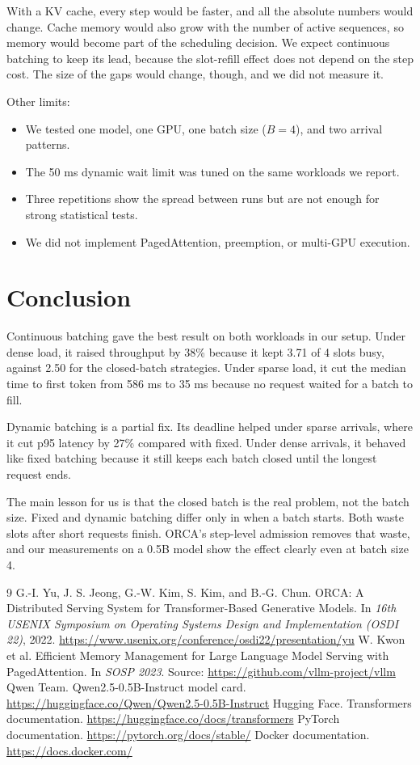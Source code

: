 \documentclass[12pt,a4paper]{article}
\begin{document}
With a KV cache, every step would be faster, and all the absolute numbers would change. Cache memory would also grow with the number of active sequences, so memory would become part of the scheduling decision. We expect continuous batching to keep its lead, because the slot-refill effect does not depend on the step cost. The size of the gaps would change, though, and we did not measure it.

Other limits:
\begin{itemize}
    \item We tested one model, one GPU, one batch size ($B = 4$), and two arrival patterns.
    \item The 50 ms dynamic wait limit was tuned on the same workloads we report.
    \item Three repetitions show the spread between runs but are not enough for strong statistical tests.
    \item We did not implement PagedAttention, preemption, or multi-GPU execution.
\end{itemize}

\section{Conclusion}
Continuous batching gave the best result on both workloads in our setup. Under dense load, it raised throughput by 38\% because it kept 3.71 of 4 slots busy, against 2.50 for the closed-batch strategies. Under sparse load, it cut the median time to first token from 586 ms to 35 ms because no request waited for a batch to fill.

Dynamic batching is a partial fix. Its deadline helped under sparse arrivals, where it cut p95 latency by 27\% compared with fixed. Under dense arrivals, it behaved like fixed batching because it still keeps each batch closed until the longest request ends.

The main lesson for us is that the closed batch is the real problem, not the batch size. Fixed and dynamic batching differ only in when a batch starts. Both waste slots after short requests finish. ORCA's step-level admission removes that waste, and our measurements on a 0.5B model show the effect clearly even at batch size 4.

\begin{thebibliography}{9}
 G.-I. Yu, J. S. Jeong, G.-W. Kim, S. Kim, and B.-G. Chun. ORCA: A Distributed Serving System for Transformer-Based Generative Models. In \emph{16th USENIX Symposium on Operating Systems Design and Implementation (OSDI 22)}, 2022. \url{https://www.usenix.org/conference/osdi22/presentation/yu}
 W. Kwon et al. Efficient Memory Management for Large Language Model Serving with PagedAttention. In \emph{SOSP 2023}. Source: \url{https://github.com/vllm-project/vllm}
 Qwen Team. Qwen2.5-0.5B-Instruct model card. \url{https://huggingface.co/Qwen/Qwen2.5-0.5B-Instruct}
 Hugging Face. Transformers documentation. \url{https://huggingface.co/docs/transformers}
 PyTorch documentation. \url{https://pytorch.org/docs/stable/}
 Docker documentation. \url{https://docs.docker.com/}
\end{thebibliography}
\end{document}
